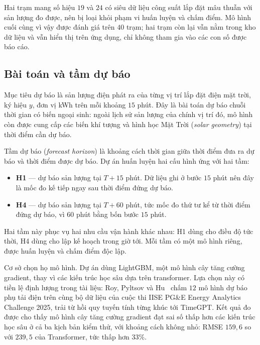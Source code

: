 \documentclass[12pt, a4paper]{report}
\begin{document}
Hai trạm mang số hiệu $19$ và $24$ có siêu dữ liệu công suất lắp đặt mâu thuẫn với
sản lượng đo được, nên bị loại khỏi phạm vi huấn luyện và chấm điểm. Mô hình cuối cùng
vì vậy được đánh giá trên $40$ trạm; hai trạm còn lại vẫn nằm trong kho dữ liệu và vẫn
hiển thị trên ứng dụng, chỉ không tham gia vào các con số được báo cáo.
\FloatBarrier
\subsection{Bài toán và tầm dự báo}

Mục tiêu dự báo là sản lượng điện phát ra của từng vị trí lắp đặt điện mặt trời, ký hiệu
$y$, đơn vị kWh trên mỗi khoảng $15$ phút. Đây là bài toán dự báo chuỗi thời gian có
biến ngoại sinh: ngoài lịch sử sản lượng của chính vị trí đó, mô hình còn được cung cấp
các biến khí tượng và hình học Mặt Trời (\textit{solar geometry}) tại thời điểm cần dự báo.

Tầm dự báo (\textit{forecast horizon}) là khoảng cách thời gian giữa thời
điểm đưa ra dự báo và thời điểm được dự báo. Dự án huấn luyện hai cấu hình ứng với hai
tầm:

\begin{itemize}
    \item \textbf{H1} --- dự báo sản lượng tại $T + 15$ phút. Dữ liệu ghi ở bước $15$ phút
    nên đây là mốc đo kế tiếp ngay sau thời điểm đứng dự báo.
    \item \textbf{H4} --- dự báo sản lượng tại $T + 60$ phút, tức mốc đo thứ tư kể từ thời
    điểm đứng dự báo, vì $60$ phút bằng bốn bước $15$ phút.
\end{itemize}

Hai tầm này phục vụ hai nhu cầu vận hành khác nhau: H1 dùng cho điều độ tức thời, H4
dùng cho lập kế hoạch trong giờ tới. Mỗi tầm có một mô hình riêng, được huấn luyện và
chấm điểm độc lập.

Cơ sở chọn họ mô hình. Dự án dùng LightGBM, một mô hình cây tăng cường
gradient, thay vì các kiến trúc học sâu dựa trên transformer. Lựa chọn này có tiền
lệ định lượng trong tài liệu: Roy, Pyltsov và Hu~\cite{roy2025hourly} chấm $12$ mô hình
dự báo phụ tải điện trên cùng bộ dữ liệu của cuộc thi IISE PG\&E Energy Analytics
Challenge 2025, trải từ hồi quy tuyến tính từng khúc tới TimeGPT. Kết quả đo được cho
thấy mô hình cây tăng cường gradient đạt sai số thấp hơn các kiến trúc học sâu ở cả ba
kịch bản kiểm thử, với khoảng cách không nhỏ: RMSE $159{,}6$ so với $239{,}5$ của
Transformer, tức thấp hơn $33\%$.
\end{document}
